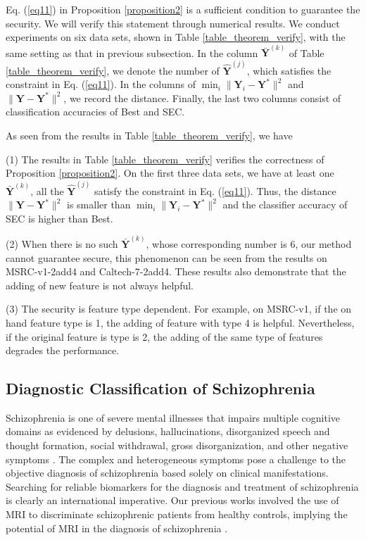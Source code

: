 \documentclass[10pt,journal,compsoc]{IEEEtran}
\begin{document}
Eq. (\ref{eq11}) in Proposition \ref{proposition2} is a sufficient condition to guarantee the security. We will verify this statement through numerical results. We conduct experiments on six data sets, shown in Table \ref{table_theorem_verify}, with the same setting as that in previous subsection. In the column $\bar{\mathbf{Y}}^{(k)}$ of Table \ref{table_theorem_verify}, we denote the number of $\hat{\mathbf{Y}}^{(j)}$, which satisfies the constraint in Eq. (\ref{eq11}). In the columns of $\min_i \|\mathbf{Y}_i-\mathbf{Y}^{*}\|^2$ and $\|\mathbf{Y} - \mathbf{Y}^{*} \|^2$, we record the distance. Finally, the last two columns consist of classification accuracies of Best and SEC.

As seen from the results in Table \ref{table_theorem_verify}, we have

(1) The results in Table \ref{table_theorem_verify} verifies the correctness of Proposition \ref{proposition2}. On the first three data sets, we have at least one $\bar{\mathbf{Y}}^{(k)}$, all the $\hat{\mathbf{Y}}^{(j)}$ satisfy the constraint in Eq. (\ref{eq11}). Thus, the distance $\|\mathbf{Y} - \mathbf{Y}^{*} \|^2$ is smaller than $\min_i \|\mathbf{Y}_i-\mathbf{Y}^{*}\|^2$ and the classifier accuracy of SEC is higher than Best.

(2) When there is no such $\bar{\mathbf{Y}}^{(k)}$, whose corresponding number is 6, our method cannot guarantee secure, this phenomenon can be seen from the results on MSRC-v1-2add4 and Caltech-7-2add4. These results also demonstrate that the adding of new feature is not always helpful.

(3) The security is feature type dependent. For example, on MSRC-v1, if the on hand feature type is 1, the adding of feature with type 4 is helpful. Nevertheless, if the original feature is type is 2, the adding of the same type of features degrades the performance.

\subsection{Diagnostic Classification of Schizophrenia}
\label{sec_application}

Schizophrenia is one of severe mental illnesses that impairs multiple cognitive domains as evidenced by delusions, hallucinations, disorganized speech and thought formation, social withdrawal, gross disorganization, and other negative symptoms \cite{APA2013}. The complex and heterogeneous symptoms pose a challenge to the objective diagnosis of schizophrenia based solely on clinical manifestations. Searching for reliable biomarkers for the diagnosis and treatment of schizophrenia is clearly an international imperative. Our previous works involved the use of MRI to discriminate schizophrenic patients from healthy controls, implying the potential of MRI in the diagnosis of schizophrenia \cite{Shen2009, Wang2015Evidence}.
\end{document}
